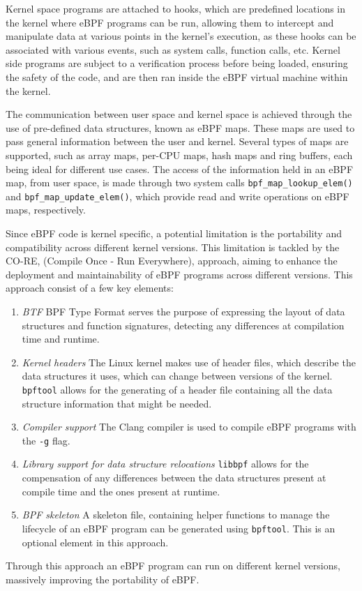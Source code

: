 Kernel space programs are attached to hooks, which are predefined locations in the kernel where eBPF programs can be run, allowing them to intercept and manipulate data at various points in the kernel's execution, as these hooks can be associated with various events, such as system calls, function calls, etc. Kernel side programs are subject to a verification process before being loaded, ensuring the safety of the code, and are then ran inside the eBPF virtual machine within the kernel.

The communication between user space and kernel space is achieved through the use of pre-defined data structures, known as eBPF maps. These maps are used to pass general information between the user and kernel. Several types of maps are supported, such as array maps, per-CPU maps, hash maps and ring buffers, each being ideal for different use cases. The access of the information held in an eBPF map, from user space, is made through two system calls \texttt{bpf\_map\_lookup\_elem()} and \texttt{bpf\_map\_update\_elem()}, which provide read and write operations on eBPF maps, respectively.

Since eBPF code is kernel specific, a potential limitation is the portability and compatibility across different kernel versions. This limitation is tackled by the CO-RE, (Compile Once - Run Everywhere), approach, aiming to enhance the deployment and maintainability of eBPF programs across different versions. This approach consist of a few key elements:
\begin{enumerate}
	\item \textit{BTF} BPF Type Format serves the purpose of expressing the layout of data structures and function signatures, detecting any differences at compilation time and runtime.
	\item \textit{Kernel headers} The Linux kernel makes use of header files, which describe the data structures it uses, which can change between versions of the kernel. \texttt{bpftool} allows for the generating of a header file containing all the data structure information that might be needed.
	\item \textit{Compiler support} The Clang compiler is used to compile eBPF programs with the \texttt{-g} flag.
	\item \textit{Library support for data structure relocations} \texttt{libbpf} allows for the compensation of any differences between the data structures present at compile time and the ones present at runtime.
	\item \textit{BPF skeleton} A skeleton file, containing helper functions to manage the lifecycle of an eBPF program can be generated using \texttt{bpftool}. This is an optional element in this approach.
\end{enumerate}
Through this approach an eBPF program can run on different kernel versions, massively improving the portability of eBPF.

